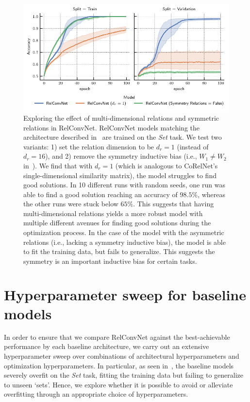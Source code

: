 \begin{figure}[H]
    \centering
    \includegraphics{figs/experiments/contains_set_training_curves_relconvnet_ablation.pdf}
    \caption{Exploring the effect of multi-dimensional relations and symmetric relations in RelConvNet. RelConvNet models matching the architecture described in~ are trained on the \textit{Set} task. We test two variants: 1) set the relation dimension to be $d_r = 1$ (instead of $d_r = 16$), and 2) remove the symmetry inductive bias (i.e., $W_1 \neq W_2$ in~). We find that with $d_r = 1$ (which is analogous to CoRelNet's single-dimensional similarity matrix), the model struggles to find good solutions. In 10 different runs with random seeds, one run was able to find a good solution reaching an accuracy of $98.5\%$, whereas the other runs were stuck below $65\%$. This suggests that having multi-dimensional relations yields a more robust model with multiple different avenues for finding good solutions during the optimization process. In the case of the model with the asymmetric relations (i.e., lacking a symmetry inductive bias), the model is able to fit the training data, but fails to generalize. This suggests the symmetry is an important inductive bias for certain tasks.}\label{fig:set_relconvnet_ablations}
\end{figure}

\section{Hyperparameter sweep for baseline models}\label{sec:baseline_hyperparameter_sweep}

In order to ensure that we compare RelConvNet against the best-achievable performance by each baseline architecture, we carry out an extensive hyperparameter sweep over combinations of architectural hyperparameters and optimization hyperparameters. In particular, as seen in~, the baseline models severely overfit on the \textit{Set} task, fitting the training data but failing to generalize to unseen `sets'. Hence, we explore whether it is possible to avoid or alleviate overfitting through an appropriate choice of hyperparameters.

